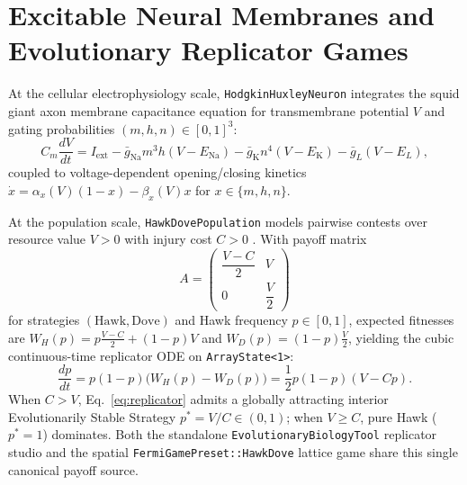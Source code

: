 \documentclass[12pt]{article}
\begin{document}
\section{Excitable Neural Membranes and Evolutionary Replicator Games}

At the cellular electrophysiology scale, \texttt{HodgkinHuxleyNeuron} integrates the squid giant axon membrane capacitance equation \cite{hodgkin1952quantitative} for transmembrane potential $V$ and gating probabilities $(m, h, n) \in [0, 1]^3$:
\begin{equation}
C_m \frac{dV}{dt} = I_{\text{ext}} - \bar{g}_{\text{Na}} m^3 h (V - E_{\text{Na}}) - \bar{g}_{\text{K}} n^4 (V - E_{\text{K}}) - \bar{g}_L (V - E_L),
\end{equation}
coupled to voltage-dependent opening/closing kinetics $\dot{x} = \alpha_x(V)(1 - x) - \beta_x(V)x$ for $x \in \{m, h, n\}$.

At the population scale, \texttt{HawkDovePopulation} models pairwise contests over resource value $V > 0$ with injury cost $C > 0$ \cite{maynardsmith1973logic}. With payoff matrix
\begin{equation}
A = \begin{pmatrix}
\dfrac{V - C}{2} & V \\[8pt]
0 & \dfrac{V}{2}
\end{pmatrix}
\end{equation}
for strategies $(\text{Hawk}, \text{Dove})$ and Hawk frequency $p \in [0, 1]$, expected fitnesses are $W_H(p) = p\frac{V-C}{2} + (1-p)V$ and $W_D(p) = (1-p)\frac{V}{2}$, yielding the cubic continuous-time replicator ODE on \texttt{ArrayState<1>}:
\begin{equation}
\frac{dp}{dt} = p(1 - p)\big(W_H(p) - W_D(p)\big) = \frac{1}{2} p(1 - p)(V - C p).
\label{eq:replicator}
\end{equation}
When $C > V$, Eq.~\eqref{eq:replicator} admits a globally attracting interior Evolutionarily Stable Strategy $p^* = V / C \in (0, 1)$; when $V \ge C$, pure Hawk ($p^* = 1$) dominates. Both the standalone \texttt{EvolutionaryBiologyTool} replicator studio and the spatial \texttt{FermiGamePreset::HawkDove} lattice game share this single canonical payoff source.



\end{document}
